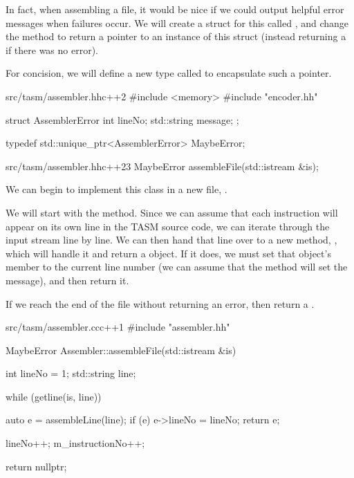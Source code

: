 In fact, when assembling a file, it would be nice if we could output helpful error messages when failures occur. We will create a struct for this called , and change the  method to return a pointer to an instance of this struct (instead returning a  if there was no error).

For concision, we will define a new type called  to encapsulate such a pointer.

\begin{file}{src/tasm/assembler.hh}{c++}{2}
#include <memory>
#include "encoder.hh"

struct AssemblerError
{
    int lineNo;
    std::string message;
};

typedef std::unique_ptr<AssemblerError> MaybeError;    
\end{file}

\begin{file}{src/tasm/assembler.hh}{c++}{23}
    MaybeError assembleFile(std::istream &is);
\end{file}

We can begin to implement this class in a new file, .

We will start with the  method. Since we can assume that each instruction will appear on its own line in the TASM source code, we can iterate through the input stream line by line. We can then hand that line over to a new method, , which will handle it and return a  object. If it does, we must set that object's  member to the current line number (we can assume that the  method will set the message), and then return it.

If we reach the end of the file without returning an error, then return a .

\begin{file}{src/tasm/assembler.cc}{c++}{1}
#include "assembler.hh"

MaybeError Assembler::assembleFile(std::istream &is)
{
    int lineNo = 1;
    std::string line;

    while (getline(is, line))
    {
        auto e = assembleLine(line);
        if (e)
        {
            e->lineNo = lineNo;
            return e;
        }

        lineNo++;
        m_instructionNo++;
    }

    return nullptr;
}
\end{file}

